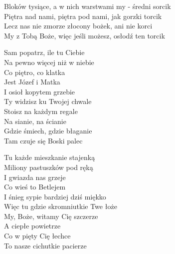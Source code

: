 \begin{text}
    Bloków tysiące, a w nich warstwami my - średni sorcik\\
    Piętra nad nami, piętra pod nami, jak gorzki torcik\\
    Lecz nas nie zmorze złocony bożek, ani nie korci\\
    My z Tobą Boże, więc jeśli możesz, osłodź ten torcik

    Sam popatrz, ile tu Ciebie\\
    Na pewno więcej niż w niebie\\
    Co piętro, co klatka\\
    Jest Józef i Matka\\
    I osioł kopytem grzebie\\
    Ty widzisz ku Twojej chwale\\
    Stoisz na każdym regale\\
    Na sianie, na ścianie\\
    Gdzie śmiech, gdzie błaganie\\
    Tam czuje się Boski palec

    Tu każde mieszkanie stajenką\\
    Miliony pastuszków pod ręką\\
    I gwiazda nas grzeje\\
    Co wieś to Betlejem\\
    I śnieg sypie bardziej dziś miękko\\
    Więc tu gdzie skromniutkie Twe łoże\\
    My, Boże, witamy Cię szczerze\\
    A ciepłe powietrze\\
    Co w pięty Cię łechce\\
    To nasze cichutkie pacierze
\end{text}
\begin{chord}

\end{chord}